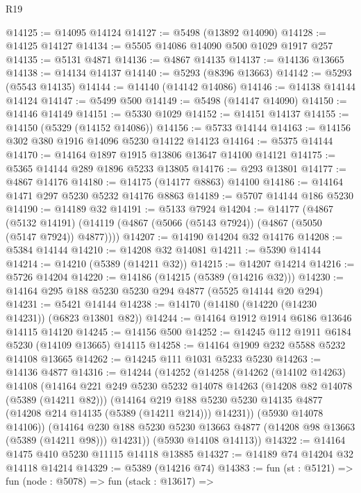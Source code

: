 \begin{lexlean}{R19}
\begin{coremodule}
@14125 := @14095 @14124
@14127 := @5498 (@13892 @14090)
@14128 := @14125 @14127
@14134 := @5505 @14086 @14090 @500 @1029 @1917 @257
@14135 := @5131 @4871
@14136 := @4867 @14135
@14137 := @14136 @13665
@14138 := @14134 @14137
@14140 := @5293 (@8396 @13663)
@14142 := @5293 (@5543 @14135)
@14144 := @14140 (@14142 @14086)
@14146 := @14138 @14144 @14124
@14147 := @5499 @500
@14149 := @5498 (@14147 @14090)
@14150 := @14146 @14149
@14151 := @5330 @1029
@14152 := @14151 @14137
@14155 := @14150 (@5329 (@14152 @14086))
@14156 := @5733 @14144
@14163 := @14156 @302 @380 @1916 @14096 @5230 @14122 @14123
@14164 := @5375 @14144
@14170 := @14164 @1897 @1915 @13806 @13647 @14100 @14121
@14175 := @5365 @14144 @289 @1896 @5233 @13805
@14176 := @293 @13801
@14177 := @4867 @14176
@14180 := @14175 (@14177 @8863) @14100
@14186 := @14164 @1471 @297 @5230 @5232 @14176 @8863
@14189 := @5707 @14144 @186 @5230
@14190 := @14189 @32
@14191 := @5133 @7924
@14204 := @14177
    (@4867
      (@5132 @14191)
      (@14119 (@4867 (@5066 (@5143 @7924)) (@4867 (@5050 (@5147 @7924)) @4877))))
@14207 := @14190 @14204 @32 @14176
@14208 := @5384 @14144
@14210 := @14208 @32 @14081
@14211 := @5390 @14144
@14214 := @14210 (@5389 (@14211 @32))
@14215 := @14207 @14214
@14216 := @5726 @14204
@14220 := @14186 (@14215 (@5389 (@14216 @32)))
@14230 := @14164 @295 @188 @5230 @5230 @294 @4877 (@5525 @14144 @20 @294)
@14231 := @5421 @14144
@14238 := @14170 (@14180 (@14220 (@14230 @14231)) (@6823 @13801 @82))
@14244 := @14164 @1912 @1914 @6186 @13646 @14115 @14120
@14245 := @14156 @500
@14252 := @14245 @112 @1911 @6184 @5230 (@14109 @13665) @14115
@14258 := @14164 @1909 @232 @5588 @5232 @14108 @13665
@14262 := @14245 @111 @1031 @5233 @5230
@14263 := @14136 @4877
@14316 := @14244
    (@14252
      (@14258
        (@14262
          (@14102 @14263)
          @14108
          (@14164
            @221
            @249
            @5230
            @5232
            @14078
            @14263
            (@14208 @82 @14078 (@5389 (@14211 @82)))
            (@14164
              @219
              @188
              @5230
              @5230
              @14135
              @4877
              (@14208 @214 @14135 (@5389 (@14211 @214)))
              @14231))
          (@5930 @14078 @14106))
        (@14164 @230 @188 @5230 @5230 @13663 @4877 (@14208 @98 @13663 (@5389 (@14211 @98))) @14231))
      (@5930 @14108 @14113))
@14322 := @14164 @1475 @410 @5230 @11115 @14118 @13885
@14327 := @14189 @74 @14204 @32 @14118 @14214
@14329 := @5389 (@14216 @74)
@14383 := fun (st : @5121) =>
  fun (node : @5078) =>
  fun (stack : @13617) =>

\end{coremodule}
\end{lexlean}

